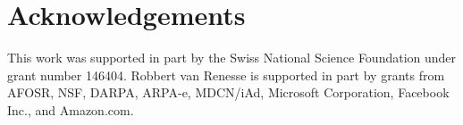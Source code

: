 \section*{Acknowledgements}
\label{sec:acknowledgements}

This work was supported in part by the Swiss National Science Foundation under grant number 146404. Robbert van Renesse is supported in part by grants from AFOSR, NSF, DARPA, ARPA-e, MDCN/iAd, Microsoft Corporation, Facebook Inc., and Amazon.com.%
